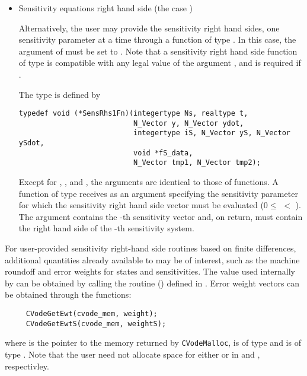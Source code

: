 \begin{itemize}
\item Sensitivity equations right hand side (the case )
  
  Alternatively, the user may provide the sensitivity right hand sides, one sensitivity
  parameter at a time through a function of type . 
  In this case, the argument  of  must be set to . 
  Note that a sensitivity right hand side function of type  is compatible with
  any legal value of the  argument , and is 
  required if .

  The type  is defined by
\begin{verbatim}
typedef void (*SensRhs1Fn)(integertype Ns, realtype t, 
                           N_Vector y, N_Vector ydot, 
                           integertype iS, N_Vector yS, N_Vector ySdot, 
                           void *fS_data,
                           N_Vector tmp1, N_Vector tmp2);
\end{verbatim}
  Except for , , and , the arguments are identical to those of 
   functions.
  A function of type  receives as an argument  specifying the
  sensitivity parameter for which the sensitivity right hand side vector must be
  evaluated ($0 \le$  $<$ ). The argument  contains the -th
  sensitivity vector and, on return,  must contain the right hand side of the
  -th sensitivity system.


%
\end{itemize}

For user-provided sensitivity right-hand side routines based on finite
differences, additional quantities already available to {\cvodes} may
be of interest, such as the machine roundoff  and error
weights for states and sensitivities. The value  used 
internally by {\cvodes} can be obtained by calling the routine
() defined in . Error weight vectors
can be obtained through the functions:
\begin{verbatim}
     CVodeGetEwt(cvode_mem, weight);
     CVodeGetEwtS(cvode_mem, weightS);
\end{verbatim}
where  is the pointer to the {\cvodes} memory returned by 
{\tt CVodeMalloc},  is of type  and 
is of type . Note that the user need not allocate space 
for either  or  in  and 
, respectivley.